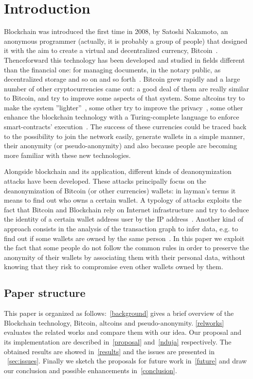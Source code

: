 \section{Introduction}
Blockchain was introduced the first time in 2008, by Satoshi Nakamoto, an
anonymous programmer (actually, it is probably a group of people) that
designed it with the aim to create a virtual and decentralized currency,
Bitcoin~\cite{bib:satoshi}.
Thenceforward this technology has been developed and
studied in fields different than the financial one: for managing documents, in
the notary public, as decentralized storage and so on and so
forth~\cite{bib:air}. Bitcoin grew
rapidly and a large number of other cryptocurrencies came out:
a good deal of them are really
similar to Bitcoin, and try to improve some aspects of that system. Some
altcoins try to make the system ''lighter''~\cite{bib:litecoin:wiki},
some other try to improve the privacy~\cite{bib:zerocoin:white_paper,
bib:zerocash:white_paper,
bib:monero:white_paper}, some other enhance the blockchain technology with a
Turing-complete language to enforce smart-contracts'
execution~\cite{bib:ethereum:whitepaper}.
The success of these
currencies could be traced back to the possibility to join the network easily,
generate wallets in a simple manner,
their anonymity (or pseudo-anonymity) and also because people are
becoming more familiar with these new technologies.


Alongside blockchain and its application, different kinds of deanonymization
attacks have been developed.
These attacks principally focus on the
deanonymization of Bitcoin (or other currencies) wallets: in layman's terms
it means to find out who owns a certain wallet.
A typology of attacks exploits the fact that Bitcoin and Blockchain rely
on Internet infrastructure and try to deduce the identity of a certain wallet
address user by the IP address~\cite{bib:deanon}.
Another kind of approach consists in the analysis of the transaction graph
to infer data, e.g. to find out if some wallets are owned by the same
person~\cite{bib:fistful}.
In this paper we exploit the fact that some people do not follow the common
rules in order to preserve the anonymity of their wallets by associating them
with their personal data, without knowing that they risk to compromise even
other wallets owned by them.


\subsection{Paper structure}
This paper is organized as follows:~\autoref{background} gives a brief
overview of the Blockchain technology, Bitcoin, altcoins and pseudo-anonymity.
\autoref{relworks} evaluates the related works and compare them
with our idea. Our proposal and its implementation are described
in~\autoref{proposal} and~\autoref{nduja} respectively.
The obtained results are showed in~\autoref{results} and the issues
are presented in ~\autoref{sec:issues}.
Finally we sketch the proposals for future work in~\autoref{future} and draw
our conclusion and possible enhancements in~\autoref{conclusion}.
